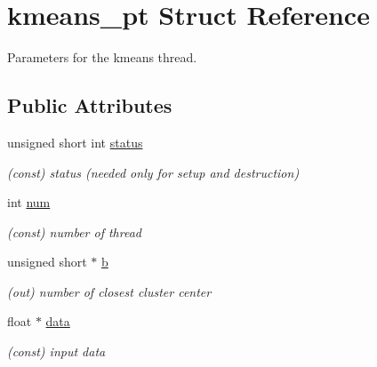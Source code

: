 \hypertarget{structkmeans__pt}{}\section{kmeans\+\_\+pt Struct Reference}
\label{structkmeans__pt}


Parameters for the kmeans thread.  


\subsection*{Public Attributes}
\begin{DoxyCompactItemize}
\item 
\mbox{\label{structkmeans__pt_adc9152bce7b95fd51d6185901169c52b}} 
unsigned short int \mbox{\hyperlink{structkmeans__pt_adc9152bce7b95fd51d6185901169c52b}{status}}
\begin{DoxyCompactList}\small\item\em (const) status (needed only for setup and destruction) \end{DoxyCompactList}\item 
\mbox{\label{structkmeans__pt_a72c17b986e5cc7bbdcc92d59ef05e8f0}} 
int \mbox{\hyperlink{structkmeans__pt_a72c17b986e5cc7bbdcc92d59ef05e8f0}{num}}
\begin{DoxyCompactList}\small\item\em (const) number of thread \end{DoxyCompactList}\item 
\mbox{\label{structkmeans__pt_a00950024e02b55ade4be01f829f7f11d}} 
unsigned short $\ast$ \mbox{\hyperlink{structkmeans__pt_a00950024e02b55ade4be01f829f7f11d}{b}}
\begin{DoxyCompactList}\small\item\em (out) number of closest cluster center \end{DoxyCompactList}\item 
\mbox{\label{structkmeans__pt_a6efb6f48fc6294152d77552f183704da}} 
float $\ast$ \mbox{\hyperlink{structkmeans__pt_a6efb6f48fc6294152d77552f183704da}{data}}
\begin{DoxyCompactList}\small\item\em (const) input data \end{DoxyCompactList}\item 

\end{DoxyCompactItemize}
